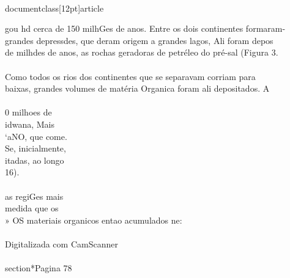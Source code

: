 \\documentclass[12pt]{article}
\begin{document}
{gou hd cerca de 150 milhGes de anos. Entre os dois continentes formaram-\\
grandes depressdes, que deram origem a grandes lagos, Ali foram depos\\
de milhdes de anos, as rochas geradoras de petréleo do pré-sal (Figura 3.\\
\\
Como todos os rios dos continentes que se separavam corriam para\\
baixas, grandes volumes de matéria Organica foram ali depositados. A\\
\\
0 milhoes de\\
idwana, Mais\\
‘aNO, que come.\\
Se, inicialmente,\\
itadas, ao longo\\
16).\\
\\
as regiGes mais\\
medida que os\\
» OS materiais organicos entao acumulados ne:\\
\\
Digitalizada com CamScanner\\

\\section*{Pagina 78}

}
\end{document}
